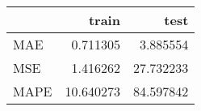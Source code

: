 \begin{tabular}{lrr}
\toprule
{} &      train &       test \\
\midrule
MAE  &   0.711305 &   3.885554 \\
MSE  &   1.416262 &  27.732233 \\
MAPE &  10.640273 &  84.597842 \\
\bottomrule
\end{tabular}
